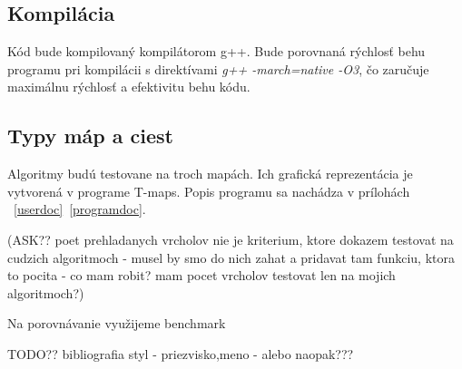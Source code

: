 \subsection{Kompilácia}
Kód bude kompilovaný kompilátorom g++. Bude porovnaná
rýchlosť behu programu pri kompilácii s direktívami \emph{g++ -march=native -O3}, čo zaručuje maximálnu rýchlosť a efektivitu behu kódu.

\subsection{Typy máp a ciest}
Algoritmy budú testovane na troch mapách. 
Ich grafická reprezentácia je vytvorená v programe T-maps.
Popis programu sa nachádza v prílohách ~\ref{userdoc}~\ref{programdoc}.







(ASK?? poet prehladanych vrcholov nie je kriterium, ktore dokazem testovat na cudzich algoritmoch - musel by smo do nich zahat a pridavat tam funkciu, ktora to pocita - co mam robit? mam pocet vrcholov testovat len na mojich algoritmoch?)




Na porovnávanie využijeme benchmark

TODO?? bibliografia styl - priezvisko,meno - alebo naopak???